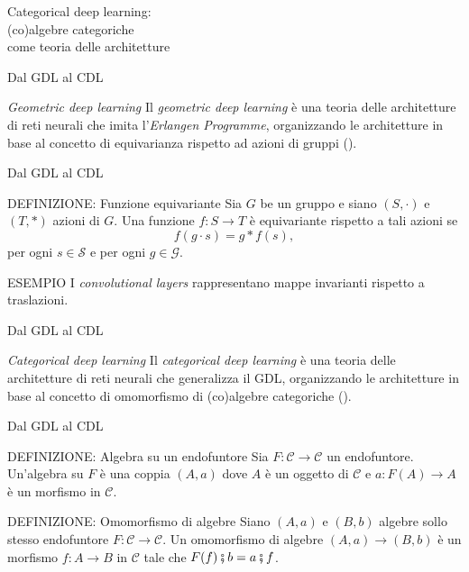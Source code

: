 \documentclass{beamer}
\begin{document}
\begin{frame}[standout]
    \huge Categorical deep learning: \\\large (co)algebre categoriche \\come teoria delle architetture
\end{frame}

\begin{frame}{Dal GDL al CDL}
    \begin{block}{\textit{Geometric deep learning}}
        Il \textit{geometric deep learning} è una teoria delle architetture di reti neurali che imita l'\textit{Erlangen Programme}, organizzando le architetture in base al concetto di equivarianza rispetto ad azioni di gruppi (\cite{bronstein2021geometric}).
    \end{block}
\end{frame}

\begin{frame}{Dal GDL al CDL}
    \begin{block}{DEFINIZIONE: Funzione equivariante}
        Sia $G$ be un gruppo e siano $(S, \cdot)$ e $(T, \ast)$ azioni di $G$. Una funzione $f: S \to T$ è equivariante rispetto a tali azioni se 
        \[f(g \cdot s) = g \ast f(s),\] 
        per ogni $s \in \mathcal{S}$ e per ogni $g \in \mathcal{G}$.
    \end{block}

    \begin{block}{ESEMPIO}
        I \textit{convolutional layers} rappresentano mappe invarianti rispetto a traslazioni.
    \end{block}
\end{frame}

\begin{frame}{Dal GDL al CDL}
    \begin{block}{\textit{Categorical deep learning}}
        Il \textit{categorical deep learning} è una teoria delle architetture di reti neurali che generalizza il GDL, organizzando le architetture in base al concetto di omomorfismo di (co)algebre categoriche (\cite{gavranovicposition}).
    \end{block}
\end{frame}

\begin{frame}{Dal GDL al CDL}
    \begin{block}{DEFINIZIONE: Algebra su un endofuntore}
        Sia $F: \mathcal{C} \to \mathcal{C}$ un endofuntore. Un'algebra su $F$ è una coppia $(A,a)$ dove $A$ è un oggetto di $\mathcal{C}$ e $a: F(A) \to A$ è un morfismo in $\mathcal{C}$.
    \end{block}

    \begin{block}{DEFINIZIONE: Omomorfismo di algebre}
        Siano $(A,a)$ e $(B,b)$ algebre sollo stesso endofuntore $F: \mathcal{C} \to \mathcal{C}$. Un omomorfismo di algebre $(A,a) \to (B,b)$ è un morfismo $f: A \to B$ in $\mathcal{C}$ tale che $F(f) \fatsemi b =  a \fatsemi f$.
    \end{block}
\end{frame}
\end{document}
